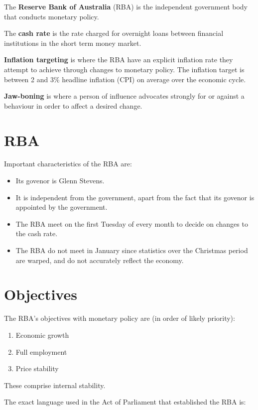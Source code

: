 \documentclass[a4paper,11pt]{report}
\begin{document}
The \textbf{Reserve Bank of Australia} (RBA) is the independent government body
that conducts monetary policy.

The \textbf{cash rate} is the rate charged for overnight loans between
financial institutions in the short term money market.

\textbf{Inflation targeting} is where the RBA have an explicit inflation rate
they attempt to achieve through changes to monetary policy. The inflation
target is between 2 and 3\% headline inflation (CPI) on average over the
economic cycle.

\textbf{Jaw-boning} is where a person of influence advocates strongly for or
against a behaviour in order to affect a desired change.


\section{RBA}

Important characteristics of the RBA are:

\begin{itemize}
\item Its govenor is Glenn Stevens.
\item It is independent from the government, apart from the fact that its
	govenor is appointed by the government.
\item The RBA meet on the first Tuesday of every month to decide on changes to
	the cash rate.
\item The RBA do not meet in January since statistics over the Christmas period
	are warped, and do not accurately reflect the economy.
\end{itemize}


\section{Objectives}

The RBA's objectives with monetary policy are (in order of likely priority):

\begin{enumerate}
\item Economic growth
\item Full employment
\item Price stability
\end{enumerate}

These comprise internal stability.

The exact language used in the Act of Parliament that established the RBA is:
\end{document}
